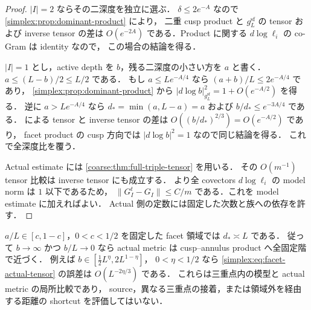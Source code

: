 \begin{proof}
$|I|=2$ ならその二深度を独立に選ぶ．
$\delta\le2e^{-A}$ なので \cref{simplex:prop:dominant-product} により，
二重 cusp product と $g_L^{\mathrm{sf}}$ の tensor および inverse tensor の差は
$O(e^{-2A})$ である．Product に関する $d\log\ell_i$ の co-Gram は identity なので，
この場合の結論を得る．

$|I|=1$ とし，active depth を $b$，残る二深度の小さい方を $a$ と書く．
$a\le(L-b)/2\le L/2$ である．
もし $a\le Le^{-A/4}$ なら $(a+b)/L\le2e^{-A/4}$ であり，
\cref{simplex:prop:dominant-product} から
$|d\log b|_{g_L^{\mathrm{sf}}}^2=1+O(e^{-A/2})$ を得る．
逆に $a>Le^{-A/4}$ なら
$d_*=\min(a,L-a)=a$ および $b/d_*\le e^{-3A/4}$ である．
 による tensor と inverse tensor の差は
$O((b/d_*)^{2/3})=O(e^{-A/2})$ であり，
facet product の cusp 方向では $|d\log b|^2=1$ なので同じ結論を得る．
これで全深度比を覆う．

Actual estimate には \cref{coarse:thm:full-triple-tensor} を用いる．
その $O(m^{-1})$ tensor 比較は inverse tensor にも成立する．
 より全 covectors $d\log\ell_i$ の
model norm は $1$ 以下であるため，
$\|G_I^t-G_I\|\le C/m$ である．これを model estimate に加えればよい．
Actual 側の定数には固定した次数と族への依存を許す．
\end{proof}

\begin{remark}[適用範囲]
\label{simplex:rem:boundary-scope}
$a/L\in[c,1-c]$，$0<c<1/2$ を固定した facet 領域では $d_*\asymp L$ である．
従って $b\to\infty$ かつ $b/L\to0$ なら actual metric は
cusp--annulus product へ全固定階で近づく．
例えば $b\in[\tfrac12L^\eta,2L^{1-\eta}]$，
$0<\eta<1/2$ なら \eqref{simplex:eq:facet-actual-tensor} の誤差は
$O(L^{-2\eta/3})$ である．
これらは三重点内の模型と actual metric の局所比較であり，
source，異なる三重点の接着，または領域外を経由する距離の shortcut を評価してはいない．
\end{remark}
